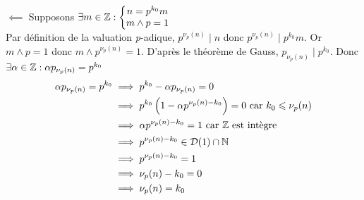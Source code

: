 \documentclass{article}
\renewenvironment{question_kholle}[2][ ]
{
	\subsection{\texorpdfstring{#2}{}}
	\notblank{#1}
	{
		\noindent #1
		\bigbreak
	}
	{}
	\begin{proof}
}
{
	\end{proof}
}
\begin{document}
\begin{question_kholle}
		$\impliedby$ Supposons $\exists m \in \mathbb Z : \left\{ \begin{matrix}
			n = p^{k_0} m \\
			m \wedge p = 1
		\end{matrix} \right.$ \\
		Par définition de la valuation \textit{p}-adique, $p^{\nu_p(n)} \;|\; n$ donc $p^{\nu_p(n)} \;|\; p^{k_0} m$. Or $m \wedge p = 1$ donc $m \wedge p^{\nu_p(n)} = 1$.
		D'après le théorème de Gauss, $p_{\nu_p(n)} \;|\; p^{k_0}$. Donc $\exists \alpha \in \mathbb Z : \alpha p_{\nu_p(n)} = p^{k_0}$
		\begin{equation*}
			\begin{aligned}
				\alpha p_{\nu_p(n)} = p^{k_0}
				&\implies p^{k_0} - \alpha p_{\nu_p(n)} = 0 \\
				&\implies p^{k_0} \left( 1 - \alpha p^{\nu_p(n) - k_0} \right) = 0 \text{ car } k_0 \leqslant \nu_p(n) \\
				&\implies \alpha p^{\nu_p(n) - k_0} = 1 \text{ car \ensuremath{\mathbb Z} est intègre} \\
				&\implies p^{\nu_p(n) - k_0} \in \mathcal{D}(1) \cap \mathbb N \\
				&\implies p^{\nu_p(n) - k_0} = 1 \\
				&\implies \nu_p(n) - k_0 = 0 \\
				&\implies \nu_p(n) = k_0 \\
			\end{aligned}
		\end{equation*}
	\end{question_kholle}
\end{document}
